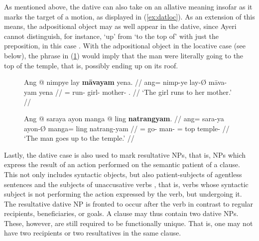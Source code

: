 As mentioned above, the dative can also take on an allative meaning insofar as
it marks the target of a motion, as displayed in (\ref{ex:datloc}). As an
extension of this means, the adpositional object may as well appear in the
dative, since Ayeri cannot distinguish, for instance, `up' from `to the top of'
with just the preposition, in this case . With the
adpositional object in the locative case (see below), the phrase in
(\ref{ex:datlocprep}) would imply that the man were literally going to the top
of the temple, that is, possibly ending up on its roof.

\begin{figure}[h]
\pex
\a\label{ex:datloc}\begingl
	\gla Ang @ nimpye lay \textbf{māvayam} yena. //
	\glb ang= nimp-ye lay-Ø māva-yam yena //
	\glc \AgtT{}= run-\TsgF{} girl-\Top{} mother-\Dat{} \TsgF{}.\Gen{} //
	\glft `The girl runs to her mother.' //
\endgl

\a\label{ex:datlocprep}\begingl
	\gla Ang @ saraya ayon manga @ ling \textbf{natrangyam}. //
	\glb ang= sara-ya ayon-Ø manga= ling natrang-yam //
	\glc \AgtT{}= go-\TsgM{} man-\Top{} \Dir{}= top temple-\Dat{} //
	\glft `The man goes up to the temple.' //
\endgl
\xe
\end{figure}

Lastly, the dative case is also used to mark resultative NPs, that is, NPs
which express the result of an action performed on the semantic patient of a
clause. This not only includes syntactic objects, but also patient-subjects of
agentless sentences and the subjects of unaccusative verbs
\citep{perlmutter1978}, that is, verbs whose syntactic subject is not
performing the action expressed by the verb, but undergoing it. The resultative
dative NP is fronted to occur after the verb in contrast to regular recipients,
beneficiaries, or goals. A clause may thus contain two dative NPs. These,
however, are still required to be functionally unique. That is, one may not
have two recipients or two resultatives in the same clause.

